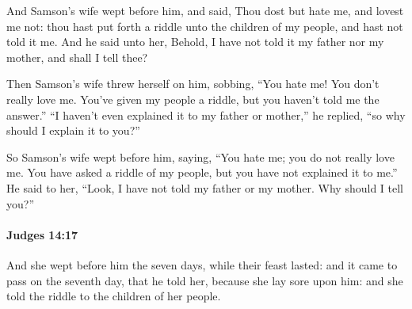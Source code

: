 			\begin{versebox}
					\item[BHS] 
					\item[ASV] And Samson's wife wept before him, and said, Thou dost but hate me, and lovest me not: thou hast put forth a riddle unto the children of my people, and hast not told it me. And he said unto her, Behold, I have not told it my father nor my mother, and shall I tell thee?
					\item[NIV] Then Samson’s wife threw herself on him, sobbing, “You hate me! You don’t really love me. You’ve given my people a riddle, but you haven’t told me the answer.” “I haven’t even explained it to my father or mother,” he replied, “so why should I explain it to you?”
					\item[NRSV] So Samson’s wife wept before him, saying, “You hate me; you do not really love me. You have asked a riddle of my people, but you have not explained it to me.” He said to her, “Look, I have not told my father or my mother. Why should I tell you?”
			\end{versebox}

		\paragraph{Judges 14:17} %
			\label{JUDGES-14-17}

			And she wept before him the seven days, while their feast lasted: and it came to pass on the seventh day, that he told her, because she lay sore upon him: and she told the riddle to the children of her people.

